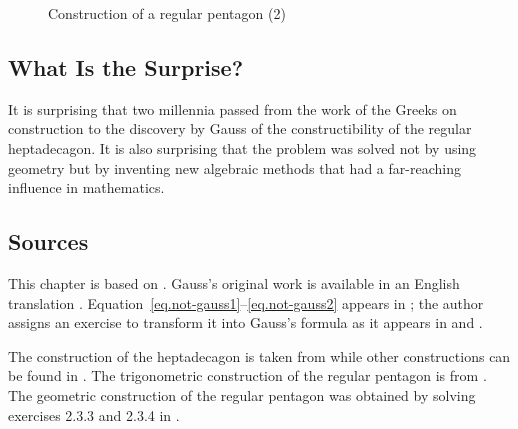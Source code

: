 \begin{figure}[t]
\begin{center}
\end{center}
\caption{Construction of a regular pentagon (2)}\label{f.hept-pentagon3}
\end{figure}

\subsection*{What Is the Surprise?}

It is surprising that two millennia passed from the work of the Greeks on construction to the discovery by Gauss of the constructibility of the regular heptadecagon. It is also surprising that the problem was solved not by using geometry but by inventing new algebraic methods that had a far-reaching influence in mathematics.


\subsection*{Sources}

This chapter is based on \cite{jorg}. Gauss's original work is available in an English translation \cite{gauss}.
Equation~\ref{eq.not-gauss1}--\ref{eq.not-gauss2} appears in \cite{rike}; the author assigns an exercise to transform it into Gauss's formula as it appears in \cite[p.~458]{gauss} and \cite[p.~68]{jorg}.

The construction of the heptadecagon is taken from \cite{callagy} while other constructions can be found in \cite{wiki:heptadecagon}. The trigonometric construction of the regular pentagon is from \cite{wiki:pentagon}. The geometric construction of the regular pentagon was obtained by solving exercises 2.3.3 and 2.3.4 in \cite{stillwell}.
